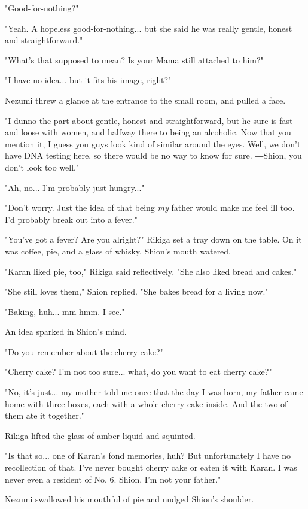 "Good-for-nothing?"

"Yeah. A hopeless good-for-nothing... but she said he was really gentle,
honest and straightforward."

"What's that supposed to mean? Is your Mama still attached to him?"

"I have no idea... but it fits his image, right?"

Nezumi threw a glance at the entrance to the small room, and pulled a
face.

"I dunno the part about gentle, honest and straightforward, but he sure
is fast and loose with women, and halfway there to being an alcoholic.
Now that you mention it, I guess you guys look kind of similar around
the eyes. Well, we don't have DNA testing here, so there would be no way
to know for sure. ―Shion, you don't look too well."

"Ah, no... I'm probably just hungry..."

"Don't worry. Just the idea of that being \emph{my} father would make me feel
ill too. I'd probably break out into a fever."

"You've got a fever? Are you alright?" Rikiga set a tray down on the
table. On it was coffee, pie, and a glass of whisky. Shion's mouth
watered.

"Karan liked pie, too," Rikiga said reflectively. "She also liked bread
and cakes."

"She still loves them," Shion replied. "She bakes bread for a living
now."

"Baking, huh... mm-hmm. I see."

An idea sparked in Shion's mind.

"Do you remember about the cherry cake?"

"Cherry cake? I'm not too sure... what, do you want to eat cherry cake?"

"No, it's just... my mother told me once that the day I was born, my
father came home with three boxes, each with a whole cherry cake inside.
And the two of them ate it together."

Rikiga lifted the glass of amber liquid and squinted.

"Is that so... one of Karan's fond memories, huh? But unfortunately I
have no recollection of that. I've never bought cherry cake or eaten it
with Karan. I was never even a resident of No. 6. Shion, I'm not your
father."

Nezumi swallowed his mouthful of pie and nudged Shion's shoulder.

